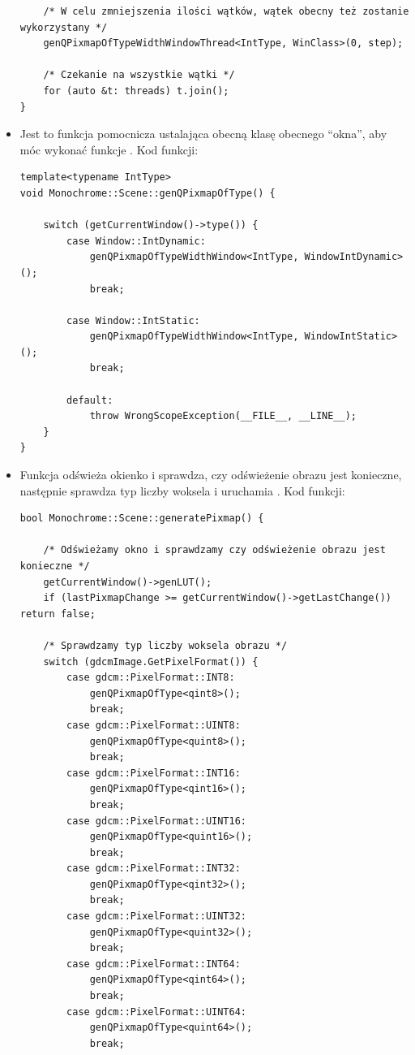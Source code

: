 \begin{itemize}
\begin{lstlisting}
    /* W celu zmniejszenia ilości wątków, wątek obecny też zostanie wykorzystany */
    genQPixmapOfTypeWidthWindowThread<IntType, WinClass>(0, step);

    /* Czekanie na wszystkie wątki */
    for (auto &t: threads) t.join();
}
\end{lstlisting}

    \item {}

          Jest to funkcja pomocnicza ustalająca obecną klasę obecnego \enquote{okna}, aby móc wykonać funkcje .
          Kod funkcji:
          \begin{lstlisting}
template<typename IntType>
void Monochrome::Scene::genQPixmapOfType() {

    switch (getCurrentWindow()->type()) {
        case Window::IntDynamic:
            genQPixmapOfTypeWidthWindow<IntType, WindowIntDynamic>();
            break;

        case Window::IntStatic:
            genQPixmapOfTypeWidthWindow<IntType, WindowIntStatic>();
            break;

        default:
            throw WrongScopeException(__FILE__, __LINE__);
    }
}
\end{lstlisting}

    \item {}

          Funkcja odświeża okienko i sprawdza, czy odświeżenie obrazu jest konieczne, następnie sprawdza typ liczby woksela i uruchamia .
          Kod funkcji:
          \begin{lstlisting}
bool Monochrome::Scene::generatePixmap() {

    /* Odświeżamy okno i sprawdzamy czy odświeżenie obrazu jest konieczne */
    getCurrentWindow()->genLUT();
    if (lastPixmapChange >= getCurrentWindow()->getLastChange()) return false;

    /* Sprawdzamy typ liczby woksela obrazu */
    switch (gdcmImage.GetPixelFormat()) {
        case gdcm::PixelFormat::INT8:
            genQPixmapOfType<qint8>();
            break;
        case gdcm::PixelFormat::UINT8:
            genQPixmapOfType<quint8>();
            break;
        case gdcm::PixelFormat::INT16:
            genQPixmapOfType<qint16>();
            break;
        case gdcm::PixelFormat::UINT16:
            genQPixmapOfType<quint16>();
            break;
        case gdcm::PixelFormat::INT32:
            genQPixmapOfType<qint32>();
            break;
        case gdcm::PixelFormat::UINT32:
            genQPixmapOfType<quint32>();
            break;
        case gdcm::PixelFormat::INT64:
            genQPixmapOfType<qint64>();
            break;
        case gdcm::PixelFormat::UINT64:
            genQPixmapOfType<quint64>();
            break;


\end{lstlisting}
\end{itemize}
